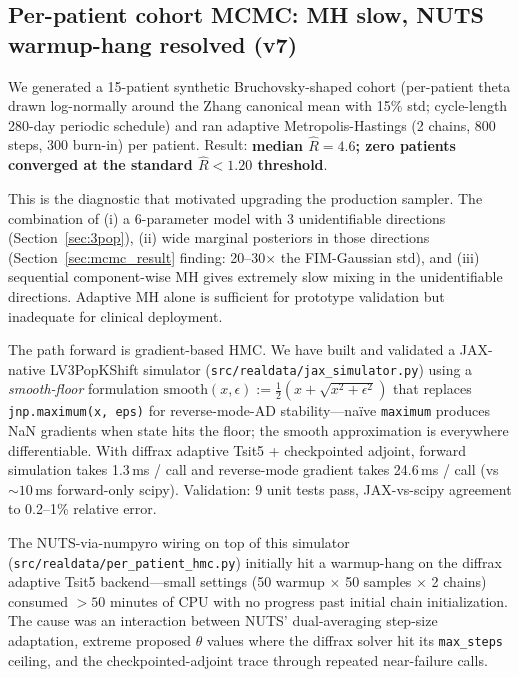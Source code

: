 \documentclass[11pt]{article}
\newcommand{\rhat}{\hat{R}}
\begin{document}
\subsection{Per-patient cohort MCMC: MH slow, NUTS warmup-hang resolved (v7)}\label{sec:cohort_mcmc}

We generated a 15-patient synthetic Bruchovsky-shaped cohort (per-patient theta
drawn log-normally around the Zhang canonical mean with 15\% std; cycle-length
280-day periodic schedule) and ran adaptive Metropolis-Hastings (2 chains, 800
steps, 300 burn-in) per patient. Result: \textbf{median $\rhat = 4.6$; zero
patients converged at the standard $\rhat < 1.20$ threshold}.

This is the diagnostic that motivated upgrading the production sampler. The
combination of (i) a 6-parameter model with 3 unidentifiable directions
(Section~\ref{sec:3pop}), (ii) wide marginal posteriors in those directions
(Section~\ref{sec:mcmc_result} finding: 20--30$\times$ the FIM-Gaussian std), and
(iii) sequential component-wise MH gives extremely slow mixing in the
unidentifiable directions. Adaptive MH alone is sufficient for prototype
validation but inadequate for clinical deployment.

The path forward is gradient-based HMC. We have built and validated a JAX-native
LV3PopKShift simulator (\texttt{src/realdata/jax\_simulator.py}) using a
\emph{smooth-floor} formulation
$\mathrm{smooth}(x, \epsilon) := \tfrac{1}{2}(x + \sqrt{x^2 + \epsilon^2})$
that replaces \texttt{jnp.maximum(x, eps)} for reverse-mode-AD stability---na\"ive
\texttt{maximum} produces NaN gradients when state hits the floor; the smooth
approximation is everywhere differentiable. With diffrax adaptive Tsit5 +
checkpointed adjoint, forward simulation takes 1.3\,ms / call and reverse-mode
gradient takes 24.6\,ms / call (vs $\sim 10$\,ms forward-only scipy). Validation:
9 unit tests pass, JAX-vs-scipy agreement to 0.2--1\% relative error.

The NUTS-via-numpyro wiring on top of this simulator
(\texttt{src/realdata/per\_patient\_hmc.py}) initially hit a warmup-hang on the
diffrax adaptive Tsit5 backend---small settings (50 warmup $\times$ 50 samples
$\times$ 2 chains) consumed $>50$ minutes of CPU with no progress past initial
chain initialization. The cause was an interaction between NUTS' dual-averaging
step-size adaptation, extreme proposed $\theta$ values where the diffrax solver
hit its \texttt{max\_steps} ceiling, and the checkpointed-adjoint trace through
repeated near-failure calls.
\end{document}
